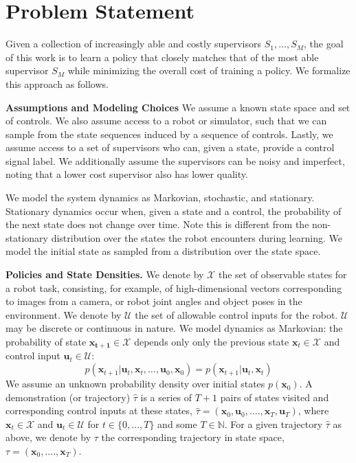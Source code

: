 \documentclass[10pt, conference]{ieeeconf}      %
\newcommand{\bu}{\mathbf{u}}
\newcommand{\bx}{\mathbf{x}}
\begin{document}
\section{Problem Statement}
Given a collection of increasingly able and costly supervisors $S_1, \ldots, S_M$, the goal of this work is to learn a
policy that closely matches that of the most able supervisor $S_M$ while minimizing the overall cost of training a
policy. We formalize this approach as follows.

\noindent\textbf{Assumptions and Modeling Choices } 
We assume a known state space and set of controls. We also assume access to a robot or simulator, such that we can sample from the state sequences induced by a sequence of controls. Lastly, we assume access to a set of supervisors who can, given a state, provide a control signal label. We additionally assume the supervisors can be noisy and imperfect, noting that a lower cost supervisor also has lower quality.

 We model the system dynamics as Markovian, stochastic, and stationary. Stationary dynamics occur when, given a state and a control, the probability of the next state does not change over time. Note this is different from the non-stationary distribution over the states the robot encounters during learning. We model the initial state as sampled from a distribution over the state space. 


\noindent\textbf{Policies and State Densities.}
We denote by $\mathcal{X}$ the set of observable states for a robot task, consisting, for example, of 
high-dimensional vectors corresponding to images from a camera, or robot joint angles and object poses in the environment.
We denote by $\mathcal{U}$ the set of allowable control inputs for the robot. $\mathcal{U}$ may be discrete or
continuous in nature. We model dynamics as Markovian: the probability of state $\mathbf{x_{t+1}}\in
\mathcal{X}$ depends only only the previous state $\mathbf{x}_t\in\mathcal{X}$ and control input $\mathbf{u}_t\in
\mathcal{U}$: 
$$p(\bx_{t+1}|\bu_{t},\bx_{t}, \ldots, \bu_{0}, \bx_{0})=p(\bx_{t+1}|\bu_{t}, \bx_t)$$
We assume an unknown probability density over initial states $p(\bx_0)$.
A demonstration (or trajectory) $\hat{\tau}$ is a series of $T+1$ pairs of states visited and corresponding
control inputs at these states, $\hat{\tau} = (\mathbf{x}_0,\mathbf{u}_0, ...., \mathbf{x}_T,\mathbf{u}_T)$, where $\bx_t\in \mathcal{X}$
and $\bu_t\in \mathcal{U}$ for $t\in \{0, \ldots, T\}$ and some $T\in \mathbb{N}$.  
For a given trajectory $\hat{\tau}$ as above, we denote by ${\tau}$ the corresponding trajectory in state space,
${\tau} = (\bx_0,....,\bx_T)$.
\end{document}

